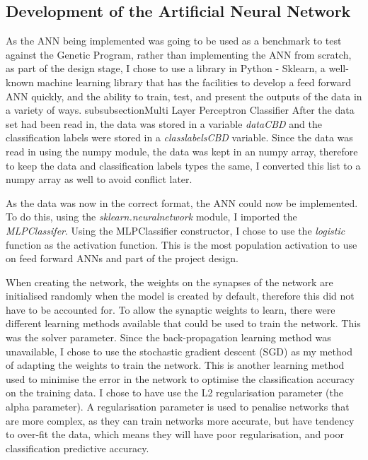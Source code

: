 \documentclass[11pt]{article}
\begin{document}
\subsection{Development of the Artificial Neural Network}
As the ANN being implemented was going to be used as a benchmark to test against the Genetic Program, rather than implementing the ANN from scratch, as part of the design stage, I chose to use a library in Python - Sklearn, a well-known machine learning library that has the facilities to develop a feed forward ANN quickly, and the ability to train, test, and present the outputs of the data in a variety of ways.  
subsubsection{Multi Layer Perceptron Classifier}
After the data set had been read in, the data was stored in a variable \textit{data\textunderscore CBD} and the classification labels were stored in a \textit{class\textunderscore labels\textunderscore CBD} variable. Since the data was read in using the numpy module, the data was kept in an numpy array, therefore to keep the data and classification labels types the same, I converted this list to a numpy array as well to avoid conflict later. 

As the data was now in the correct format, the ANN could now be implemented. To do this, using the \textit{sklearn.neural\textunderscore network} module, I imported the \textit{MLPClassifer}. Using the MLPClassifier constructor, I chose to use the \textit{logistic} function as the activation function. This is the most population activation to use on feed forward ANNs and part of the project design.

When creating the network, the weights on the synapses of the network are initialised randomly when the model is created by default, therefore this did not have to be accounted for.
To allow the synaptic weights to learn, there were different learning methods available that could be used to train the network. This was the solver parameter.  Since the back-propagation learning method was unavailable, I chose to use the stochastic gradient descent (SGD) as my method of adapting the weights to train the network. This is another learning method used to minimise the error in the network to optimise the classification accuracy on the training data. I chose to have use the L2 regularisation parameter (the alpha parameter). A regularisation parameter is used to penalise networks that are more complex, as they can train networks more accurate, but have tendency to over-fit the data, which means they will have poor regularisation, and poor classification predictive accuracy. 
\end{document}
